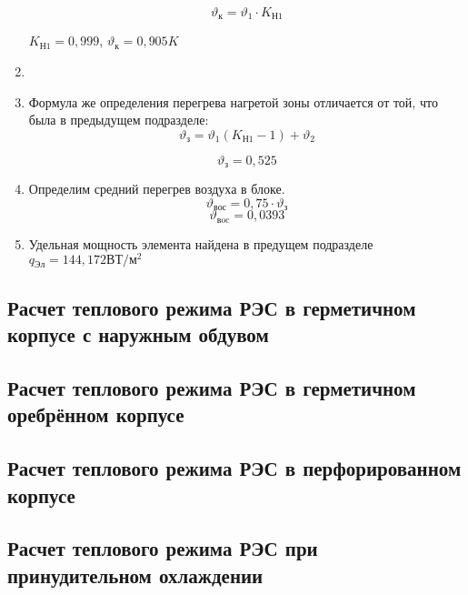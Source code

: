 \begin{enumerate}[label={\arabic*.}]
  \begin{equation}
    \vartheta\mathrm{_к} = \vartheta_1 \cdot K\mathrm{_{Н1}}
  \end{equation}

  $K\mathrm{_{Н1}} = 0,999$, $\vartheta\mathrm{_к} = 0,905 K$

\item 
\item Формула же определения перегрева нагретой зоны отличается от той,
  что была в предыдущем подразделе:
  \begin{equation}
    \vartheta\mathrm{_з} = \vartheta_1(K\mathrm{_{Н1}} - 1) + \vartheta_2
    \end{equation}

    $$\vartheta\mathrm{_з}=0,525$$
  \item Определим средний перегрев воздуха в блоке.
    \begin{equation}
      \vartheta\mathrm{_{вос}} = 0,75 \cdot \vartheta\mathrm{_з}
    \end{equation}
    $$\vartheta\mathrm{_{вoc}} = 0,0393$$
  \item Удельная мощность элемента найдена в предущем подразделе
    $q\mathrm{_{Эл}} =144,172\mathrm{ВТ/м^2} $


      
\end{enumerate}
\subsection{Расчет теплового режима РЭС в герметичном корпусе с наружным обдувом}

\subsection{Расчет теплового режима РЭС в герметичном оребрённом корпусе}

\subsection{Расчет теплового режима РЭС в перфорированном корпусе}

\subsection{Расчет теплового режима РЭС при принудительном охлаждении}%